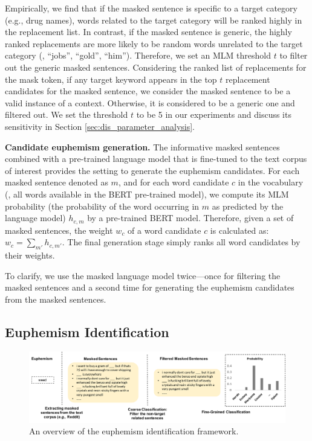 Empirically, we find that if the masked sentence is specific to a target category (e.g., drug names), words related to the target category will be ranked highly in the replacement list. 
In contrast, if the masked sentence is generic, the highly ranked replacements are more likely  to be random words unrelated to the target category (\eg, ``jobs'', ``gold'', ``him''). 
Therefore, we set an MLM threshold $t$ to filter out the generic masked sentences. 
Considering the ranked list of replacements for the mask token, if any target keyword appears in the top $t$ replacement candidates for the masked sentence, we consider  the masked sentence to be a valid instance of a context. Otherwise, it is considered to be a generic one and filtered out. 
We set the threshold $t$ to be 5 in our experiments and discuss its  sensitivity in Section \ref{sec:dis_parameter_analysis}. 


\noindent\textbf{Candidate euphemism generation.} The informative masked sentences combined with a pre-trained language model that is fine-tuned to the text corpus of interest   provides the setting to  generate the euphemism candidates. 
For each masked sentence denoted as $m$, and for each word candidate $c$ in the vocabulary (\ie, all words available in the BERT pre-trained model), we compute its MLM probability (the probability of the word occurring in $m$ as predicted by the language model) $h_{c,m}$  by a pre-trained BERT model.
Therefore, given a set of masked sentences, the weight $w_{c}$ of a word candidate $c$ is calculated as: 
$w_c = \sum_{m'}h_{c, m'}$. 
The final generation stage simply ranks all word candidates by their weights. 

To clarify, we use the masked language model twice---once for filtering the masked sentences and a second time for generating the euphemism candidates from the masked sentences. 


\subsection{Euphemism Identification}
\label{sec:model_iden}
\begin{figure}
	\centering
	\includegraphics[width=1.00\linewidth]{figures/3}
	\caption{An overview of the euphemism identification framework.}
	\label{fig:model_iden}
\end{figure}

